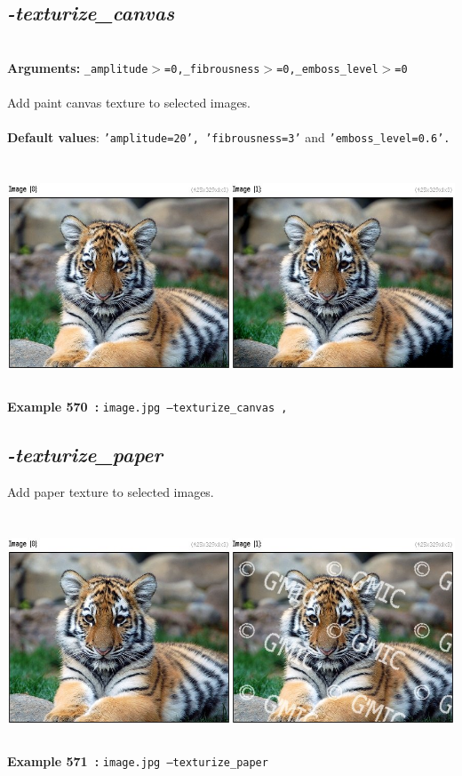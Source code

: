 \documentclass[a4paper,11pt,twoside]{book}
\begin{document}
\subsection{\emph{-texturize\_canvas} }\vspace*{-0.5em}
~\\\textbf{Arguments: } 
{\small \texttt{\_amplitude$>$=0,\_fibrousness$>$=0,\_emboss\_level$>$=0}}\\~\\
Add paint canvas texture to selected images.
~\\~\\\textbf{Default values}: {\small \texttt{'amplitude=20', 'fibrousness=3'} and \texttt{'emboss\_level=0.6'.}}
\begin{center}\includegraphics[keepaspectratio=true,height=7cm,width=\textwidth]{img/gmic_def570.jpg}\\
{\footnotesize \textbf{Example 570~:} \texttt{image.jpg --texturize\_canvas ,}}
\end{center}

\subsection{\emph{-texturize\_paper} }\vspace*{-0.5em}
Add paper texture to selected images.
\begin{center}\includegraphics[keepaspectratio=true,height=7cm,width=\textwidth]{img/gmic_def571.jpg}\\
{\footnotesize \textbf{Example 571~:} \texttt{image.jpg --texturize\_paper}}
\end{center}
\end{document}
